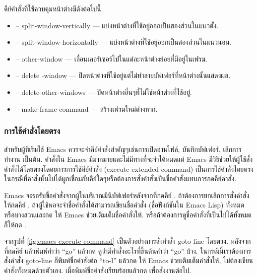 \begin{thwbr}
\begin{figure}[!hbt]
\end{figure}

คีย์คำสั่งที่ใช้ควบคุมหน้าต่างมีดังต่อไปนี้.
\begin{itemize}
\item {} -- split-window-vertically --- แบ่งหน้าต่างที่ใช้อยู่ออกเป็นสองส่วนในแนวตั้ง.
\item {} -- split-window-horizontally --- แบ่งหน้าต่างที่ใช้อยู่ออกเป็นสองส่วนในแนวนอน.
\item {} -- other-window --- เลื่อนเคอร์เซอร์ไปในแต่ละหน้าต่างย่อยที่มีอยู่ในเฟรม.
\item {} -- delete -window --- ปิดหน้าต่างที่ใช้อยู่แต่ไม่ทำลายบัฟเฟอร์ที่หน้าต่างนั้นแสดงผล.
\item {} -- delete-other-windows --- ปิดหน้าต่างอื่นๆที่ไม่ใช่หน้าต่างที่ใช้อยู่.
\item {} -- make-frame-command --- สร้างเฟรมใหม่ต่างหาก.
\end{itemize}

\subsubsection{การใช้คำสั่งโดยตรง}
สำหรับผู้ที่เริ่มใช้ Emacs ควรจะจำคีย์คำสั่งสำคัญๆเช่นการเปิดอ่านไฟล์, บันทึกบัฟเฟอร์, เลิกการทำงาน เป็นต้น. คำสั่งใน Emacs มีมากมายและไม่มีทางที่จะจำได้หมดแต่ Emacs มีวิธีช่วยให้ผู้ใช้สั่งคำสั่งได้โดยตรงโดดยการการใช้คีย์คำสั่ง  (execute-extended-command) เป็นการใช้คำสั่งโดยตรงในกรณีที่คำสั่งนั้นไม่ได้ผูกเชื่อมกับคีย์ใดๆหรือต้องการสั่งคำสั่งเป็นชื่อคำสั่งแทนการกดคีย์คำสั่ง.

Emacs จะรอรับชื่อคำสั่งจากผู้ในบริเวณมินิบัฟเฟอร์หลังจากที่กดคีย์ . ถ้าต้องการยกเลิกการสั่งคำสั่งให้กดคีย์ . ถ้าผู้ใช้พอจะจำชื่อคำสั่งได้สามารถเขียนชื่อคำสั่ง (ชื่อฟังก์ชันใน Emacs Lisp) ทั้งหมดหรือบางส่วนและกด  ให้ Emacs ช่วยเติมเต็มชื่อคำสั่งให้. หรือถ้าต้องการดูชื่อคำสั่งที่เป็นไปได้ทั้งหมดก็ให้กด  .

\begin{figure}[!hbt]
\end{figure}

จากรูปที่ \ref{fig:emacs-execute-command} เป็นตัวอย่างการสั่งคำสั่ง goto-line โดยตรง. หลังจากที่กดคีย์  แล้วพิมพ์คำว่า ``go'' แล้วกด   ดูว่ามีคำสั่งอะไรที่ขึ้นต้นคำว่า ``go'' บ้าง. ในกรณีนี้เราต้องการสั่งคำสั่ง goto-line ก็พิมพ์ชื่อคำสั่งต่อ ``to-l'' แล้วกด  ให้ Emacs ช่วยเติมเต็มคำสั่งให้, ไม่ต้องเขียนคำสั่งทั้งหมดด้วยตัวเอง. เมื่อพิมพ์ชื่อคำสั่งเรียบร้อยแล้วกด  เพื่อสั่งงานต่อไป. 


\end{thwbr}
